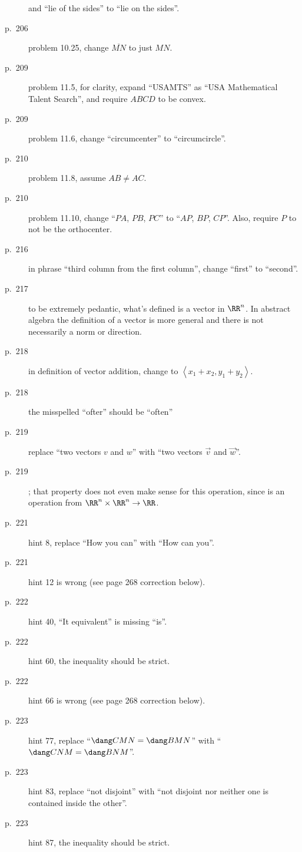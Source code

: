 \documentclass[11pt]{scrartcl}
\begin{document}
\begin{description}
  and ``lie of the sides'' to ``lie on the sides''.
\item[p.\  206] problem 10.25, change $\overline{MN}$ to just $MN$.
\item[p.\  209] problem 11.5, for clarity,
  expand ``USAMTS'' as ``USA Mathematical Talent Search'',
  and require $ABCD$ to be convex.
\item[p.\  209] problem 11.6, change ``circumcenter'' to ``circumcircle''.
\item[p.\  210] problem 11.8, assume $AB \neq AC$.
\item[p.\  210] problem 11.10, change ``$PA$, $PB$, $PC$'' to ``$AP$, $BP$, $CP$''.
  Also, require $P$ to not be the orthocenter.
\item[p.\  216] in phrase ``third column from the first column'',
  change ``first'' to ``second''.
\item[p.\  217] to be extremely pedantic, what's defined is a vector in $\RR^n$.
  In abstract algebra the definition of a vector is more general
  and there is not necessarily a norm or direction.
\item[p.\  218] in definition of vector addition,
  change to $\left\langle x_1+x_2, y_1+y_2 \right\rangle$.
\item[p.\  218] the misspelled ``ofter'' should be ``often''
\item[p.\  219] replace ``two vectors $v$ and $w$'' with ``two vectors $\vec v$ and $\vec w$''.
\item[p.\  219] ;
  that property does not even make sense for this operation,
  since is an operation from $\RR^n \times \RR^n \to \RR$.
\item[p.\  221] hint 8, replace ``How you can'' with ``How can you''.
\item[p.\  221] hint 12 is wrong (see page 268 correction below).
\item[p.\  222] hint 40, ``It equivalent'' is missing ``is''.
\item[p.\  222] hint 60, the inequality should be strict.
\item[p.\  222] hint 66 is wrong (see page 268 correction below).
\item[p.\  223] hint 77, replace ``$\dang CMN = \dang BMN$''
  with ``$\dang CNM = \dang BNM$''.
\item[p.\  223] hint 83, replace ``not disjoint'' with
  ``not disjoint nor neither one is contained inside the other''.
\item[p.\  223] hint 87, the inequality should be strict.

\end{description}
\end{document}
